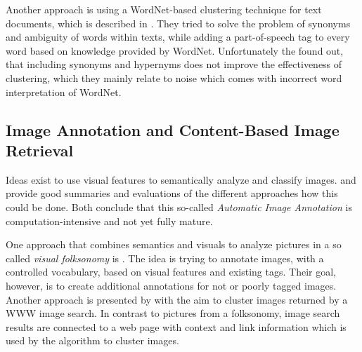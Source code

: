 Another approach is using a WordNet-based clustering technique for text documents, which is described in \cite{sedding2004wordnet}.  They tried to solve the problem of synonyms and ambiguity of words within texts, while adding a part-of-speech tag to every word based on knowledge provided by WordNet. Unfortunately the found out, that including synonyms and hypernyms does not improve the effectiveness of clustering, which they mainly relate to noise which comes with incorrect word interpretation of WordNet. 


\subsection{Image Annotation and Content-Based Image Retrieval}

Ideas exist to use visual features to semantically analyze and classify images. \cite{Liu2007} and \cite{Zhang2012} provide good summaries and evaluations of the different approaches how this could be done. Both conclude that this so-called \emph{Automatic Image Annotation}  is computation-intensive and not yet fully mature.

\bigskip
One approach that combines semantics and visuals to analyze pictures in a so called \emph{visual folksonomy} is \cite{Lindstaedt2009}. The idea is trying to annotate images, with a controlled vocabulary, based on visual features and existing tags. Their goal, however, is to create additional annotations for not or poorly tagged images. \\
Another approach is presented by \cite{cai2004hierarchical} with the aim to cluster images returned by a WWW image search. In contrast to pictures from a folksonomy, image search results are connected to a web page with context and link information which is used by the algorithm to cluster images.
